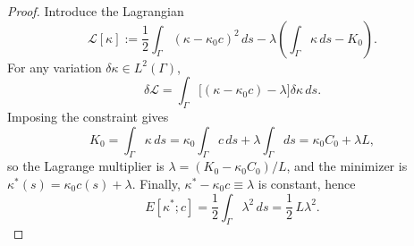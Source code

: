 \documentclass[10pt,a4paper]{amsart}
\begin{document}
\begin{proof}
Introduce the Lagrangian
\[
\mathcal{L}[\kappa]
:=\frac12\int_\Gamma(\kappa-\kappa_0 c)^2\,ds
-\lambda\left(\int_\Gamma\kappa\,ds-K_0\right).
\]
For any variation $\delta\kappa\in L^2(\Gamma)$,
\[
\delta\mathcal{L}
=\int_\Gamma \big[(\kappa-\kappa_0 c)-\lambda\big]\delta\kappa\,ds.
\]
Imposing the constraint gives
\[
K_0=\int_\Gamma \kappa\,ds
=\kappa_0\int_\Gamma c\,ds+\lambda\int_\Gamma ds
=\kappa_0 C_0+\lambda L,
\]
so the Lagrange multiplier is $\lambda=(K_0-\kappa_0 C_0)/L$, and the minimizer is $\kappa^*(s)=\kappa_0 c(s)+\lambda$.
Finally, $\kappa^*-\kappa_0 c\equiv \lambda$ is constant, hence
\[
E[\kappa^*;c]=\frac12\int_\Gamma \lambda^2\,ds=\frac12\,L\lambda^2.
\]
\end{proof}
\end{document}
